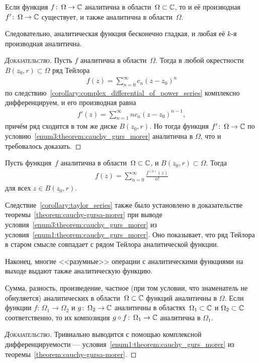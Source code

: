 \documentclass[../complex-analysis.tex]{subfiles}
\begin{document}
\begin{crly}
 Если функция $ f \colon\,\Omega\to\mathbb{C} $ аналитична в области~$ \Omega \subset \mathbb{C}$, то и её производная $ f' \colon\,\Omega\to\mathbb{C} $ существует, и также аналитична в области~$ \Omega $.

 Следовательно, аналитическая функция бесконечно гладкая, и любая её $ k $-я производная аналитична.
\end{crly}
\begin{proof}[\normalfont\textsc{Доказательство}]
 Пусть $ f $ аналитична в области~$ \Omega $. Тогда в любой окрестности~$ B(z_0, r) \subset \Omega $ ряд Тейлора
 \begin{align*}
  f(z) = \sum_{n=0}^{\infty} c_n (z-z_0)^{n}
 \end{align*} по следствию~\ref{corollary:complex_differential_of_power_series} комплексно дифференцируем, и его производная равна
 \begin{align*}
  f'(z) = \sum_{n=1}^{\infty} nc_n (z-z_0)^{n-1},
 \end{align*} причём ряд сходится в том же диске $ B(z_0,r) $. Но тогда функция $ f' \colon\,\Omega\to\mathbb{C} $ по условию~\ref{enum3:theorem:cauchy_gurs_morer} аналитична в $ \Omega $, что и требовалось доказать.
\end{proof}

\begin{crly}
 \label{corollary:taylor_series}
 Пусть функция~$ f $ аналитична в области~$ \Omega \subset \mathbb{C} $, и $ B(z_0, r) \subset \Omega $. Тогда
 \begin{align*}
  f(z) = \sum_{n=0}^{\infty} \frac{f^{(n)}(z)}{n!}
 \end{align*} для всех $ z \in B(z_0,r) $.
\end{crly}

Следствие~\ref{corollary:taylor_series} также было установлено в доказательстве теоремы~\ref{theorem:cauchy-gursa-morer} при выводе условия~\ref{enum3:theorem:cauchy_gurs_morer} из условия~\ref{enum1:theorem:cauchy_gurs_morer}. Оно показывает, что ряд Тейлора в старом смысле совпадает с рядом Тейлора аналитической функции.

Наконец, многие <<разумные>> операции с аналитическими функциями на выходе выдают также аналитическую функцию.
\begin{crly}
 Сумма, разность, произведение, частное (при том условии, что знаменатель не обнуляется) аналитических в области~$ \Omega \subset \mathbb{C} $ функций аналитичны в $ \Omega $. Если функции $ f \colon\,\Omega_1 \to \Omega_2 $ и $ g \colon\,\Omega_2 \to \mathbb{C} $ аналитичны в областях~$ \Omega_1 \subset \mathbb{C}$ и $ \Omega_2 \subset \mathbb{C} $ соответственно, то их композиция $ g \circ f \colon\,\Omega_1 \to \mathbb{C} $ аналитична в $ \Omega_1 $.
\end{crly}
\begin{proof}[\normalfont\textsc{Доказательство}]
 Тривиально выводится с помощью комплексной дифференцируемости --- условия~\ref{enum1:theorem:cauchy_gurs_morer} из теоремы~\ref{theorem:cauchy-gursa-morer}.
\end{proof}
\end{document}
